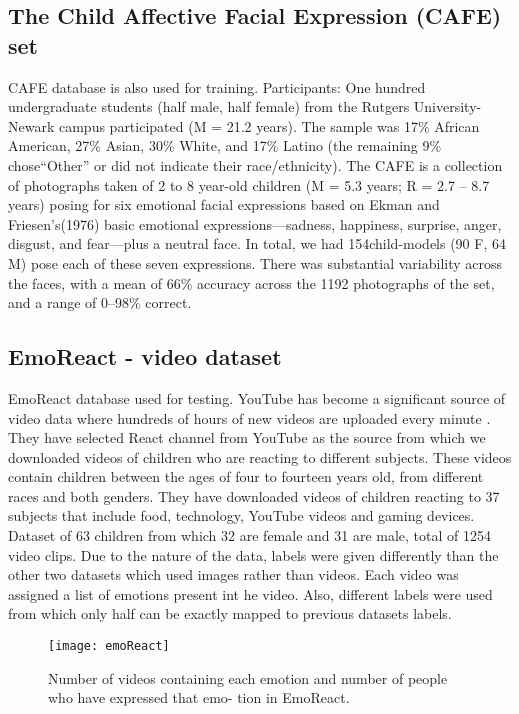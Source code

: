 \documentclass[runningheads,a4paper,11pt]{report}
\begin{document}
{\subsection{The Child Affective Facial Expression (CAFE) set}}
CAFE database is also used for training.
Participants: One hundred undergraduate students (half male, half female) from the Rutgers University-Newark campus participated (M =
21.2 years). The sample was 17\% African
American, 27\% Asian, 30\% White, and 17\% Latino (the remaining 9\% chose“Other” or did not indicate their race/ethnicity).
\cite{LoBue14}
The CAFE is a collection of photographs taken of 2 to 8 year-old children (M = 5.3 years; R = 2.7 – 8.7 years) posing for six emotional facial expressions based on Ekman and Friesen’s(1976) basic emotional expressions—sadness, happiness, surprise, anger, disgust, and fear—plus a neutral face.
In total, we had 154child-models (90 F, 64 M) pose each of these seven expressions. There was substantial variability across the faces, with a mean of 66\% accuracy across the 1192 photographs of the set, and a range of 0–98\% correct.


{\subsection{EmoReact - video dataset}}
EmoReact database used for testing.
YouTube has become a significant source of video data where hundreds of hours of new videos are uploaded every minute . They have selected React channel from YouTube as the source from which we downloaded videos of children who are reacting to different subjects. These videos contain children between the ages of four to fourteen years old, from
different races and both genders. They have downloaded videos of children reacting to 37 subjects that include food, technology, YouTube
videos and gaming devices.
Dataset of 63 children from which 32 are female and 31 are male, total of 1254 video clips.\cite{Nojavanasghari16}
Due to the nature of the data, labels were given differently than the other two datasets which used images rather than videos. Each video was assigned a list of emotions present int he video. Also, different labels were used from which only half can be exactly mapped to previous datasets labels.

 \begin{figure}
    	\centerline{\texttt{[image: emoReact]}}
   		\caption{Number of videos containing each emotion
and number of people who have expressed that emo-
tion in EmoReact.\cite{Nojavanasghari16}}
    \end{figure}
\end{document}
